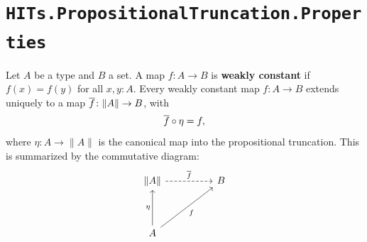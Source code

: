 \section{\texttt{HITs.PropositionalTruncation.Properties}}

\begin{theorem}
  \label{recSet}
  Let $A$ be a type and $B$ a set. A map $f \colon A \to B$ is \textbf{weakly constant} if $f(x) = f(y)$ for all $x, y : A$. Every weakly constant map $f : A \to B$ extends uniquely to a map $\overline{f} \colon \lVert A \rVert \to B$, with
  \[
    \overline{f} \circ \eta = f,
  \]
  where $\eta : A \to \lVert A \rVert$ is the canonical map into the propositional truncation.
  This is summarized by the commutative diagram:
  \[
    \begin{tikzcd}[column sep=huge, row sep=huge]
      \lVert A \rVert \arrow[r, dashed, "\lift{f}"] & B \\
      A \arrow[u, "\eta"] \arrow[ur, "f"']
    \end{tikzcd}
  \]
\end{theorem}
